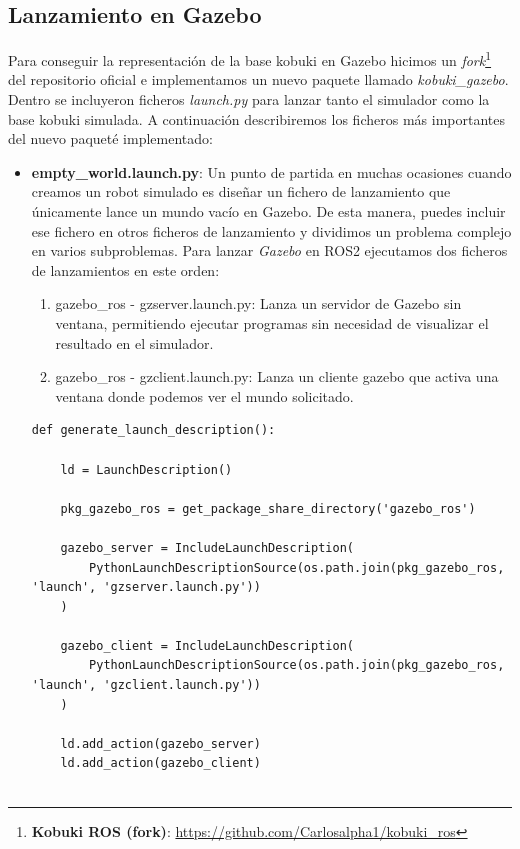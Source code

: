 \subsection{Lanzamiento en Gazebo}
\label{subsec:kobuki_gazebo}

Para conseguir la representación de la base kobuki en Gazebo hicimos un \textit{fork}\footnote{\textbf{Kobuki ROS (fork)}: \url{https://github.com/Carlosalpha1/kobuki_ros}} del repositorio oficial e implementamos un nuevo paquete llamado \textit{kobuki\_gazebo}. Dentro se incluyeron ficheros \textit{launch.py} para lanzar tanto el simulador como la base kobuki simulada. A continuación describiremos los ficheros más importantes del nuevo paqueté implementado:

\begin{itemize}
	\item \textbf{empty\_world.launch.py}: Un punto de partida en muchas ocasiones cuando creamos un robot simulado es diseñar un fichero de lanzamiento que únicamente lance un mundo vacío en Gazebo. De esta manera, puedes incluir ese fichero en otros ficheros de lanzamiento y dividimos un problema complejo en varios subproblemas. Para lanzar \textit{Gazebo} en ROS2 ejecutamos dos ficheros de lanzamientos en este orden:
	\begin{enumerate}
		\item gazebo\_ros - gzserver.launch.py: Lanza un servidor de Gazebo sin ventana, permitiendo ejecutar programas sin necesidad de visualizar el resultado en el simulador.
		\item gazebo\_ros - gzclient.launch.py: Lanza un cliente gazebo que activa una ventana donde podemos ver el mundo solicitado.
	\end{enumerate}
	
	\cleardoublepage
\begin{code}[H]
\begin{lstlisting}[frame=single]
def generate_launch_description():

	ld = LaunchDescription()

	pkg_gazebo_ros = get_package_share_directory('gazebo_ros')
		
	gazebo_server = IncludeLaunchDescription(
		PythonLaunchDescriptionSource(os.path.join(pkg_gazebo_ros, 'launch', 'gzserver.launch.py'))
	)
		
	gazebo_client = IncludeLaunchDescription(
		PythonLaunchDescriptionSource(os.path.join(pkg_gazebo_ros, 'launch', 'gzclient.launch.py'))
	)
	
	ld.add_action(gazebo_server)
	ld.add_action(gazebo_client)
	

\end{lstlisting}
\end{code}
\end{itemize}
